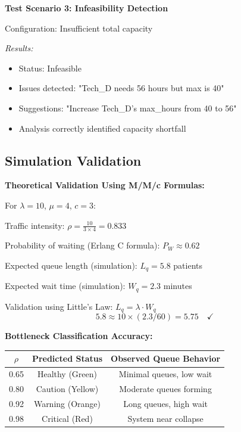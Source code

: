 \documentclass[12pt,a4paper]{article}
\begin{document}
\textbf{Test Scenario 3: Infeasibility Detection}

Configuration: Insufficient total capacity

\textit{Results:}
\begin{itemize}
    \item Status: Infeasible
    \item Issues detected: "Tech\_D needs 56 hours but max is 40"
    \item Suggestions: "Increase Tech\_D's max\_hours from 40 to 56"
    \item Analysis correctly identified capacity shortfall
\end{itemize}

\subsection{Simulation Validation}

\textbf{Theoretical Validation Using M/M/c Formulas:}

For $\lambda = 10$, $\mu = 4$, $c = 3$:

Traffic intensity: $\rho = \frac{10}{3 \times 4} = 0.833$

Probability of waiting (Erlang C formula): $P_W \approx 0.62$

Expected queue length (simulation): $L_q = 5.8$ patients

Expected wait time (simulation): $W_q = 2.3$ minutes

Validation using Little's Law: $L_q = \lambda \cdot W_q$
\begin{equation}
5.8 \approx 10 \times (2.3/60) = 5.75 \quad \checkmark
\end{equation}

\textbf{Bottleneck Classification Accuracy:}

\begin{center}
\begin{tabular}{ccc}
\toprule
$\rho$ & Predicted Status & Observed Queue Behavior \\
\midrule
0.65 & Healthy (Green) & Minimal queues, low wait \\
0.80 & Caution (Yellow) & Moderate queues forming \\
0.92 & Warning (Orange) & Long queues, high wait \\
0.98 & Critical (Red) & System near collapse \\
\bottomrule
\end{tabular}
\end{center}
\end{document}
